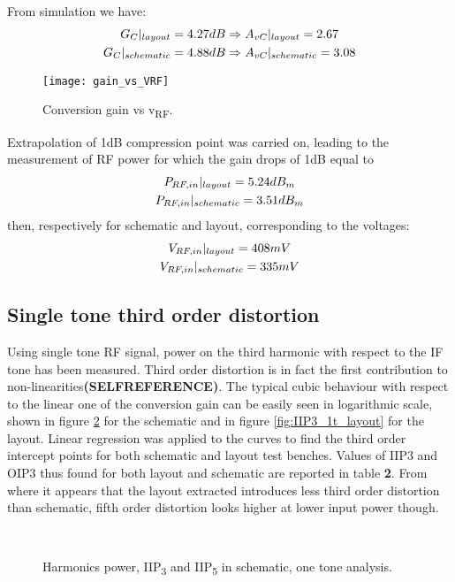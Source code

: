 From simulation we have:
\begin{gather}
G_C|_{layout}=4.27dB \Rightarrow A_{vC}|_{layout}=2.67 \notag \\ 
G_C|_{schematic}=4.88dB\Rightarrow A_{vC}|_{schematic}=3.08 \notag
\end{gather}
\begin{figure}[H]
	\centering
	\texttt{[image: gain\_vs\_VRF]}
	\caption{Conversion gain vs v\textsubscript{RF}.}
	\label{fig:GainvsRF}
\end{figure}

Extrapolation of 1dB compression point was carried on, leading to the measurement of RF power for which the gain drops of 1dB equal to 
\begin{gather}
 P_{RF,in}|_{layout}=5.24dB_{m} \notag \\
 P_{RF,in}|_{schematic}=3.51dB_{m} \notag
\end{gather}
then, respectively for schematic and layout, corresponding to the voltages:
\begin{gather}
V_{RF,in}|_{layout}=408mV \notag \\
V_{RF,in}|_{schematic}=335mV \notag
\end{gather}

\subsection{Single tone third order distortion}
Using single tone RF signal, power on the third harmonic with respect to the IF tone has been measured. Third order distortion is in fact the first contribution to non-linearities\textbf{(SELFREFERENCE)}. 
The typical cubic behaviour with respect to the linear one of the conversion gain can be easily seen in logarithmic scale, shown in figure \ref{fig:IIP3_1t_schem} for the schematic and in figure \ref{fig:IIP3_1t_layout} for the layout. 
Linear regression was applied to the curves to find the third order intercept points for both schematic and layout test benches. Values of IIP3 and OIP3 thus found for both layout and schematic are reported in table \textbf{2}. From where it appears that the layout extracted introduces less third order distortion than schematic, fifth order distortion looks higher at lower input power though.

\begin{figure}[H] 
	\centering
	 \\
	\caption{Harmonics power, IIP\textsubscript{3} and IIP\textsubscript{5} in schematic, one tone analysis.}
	\label{fig:IIP3_1t_schem}
\end{figure}

